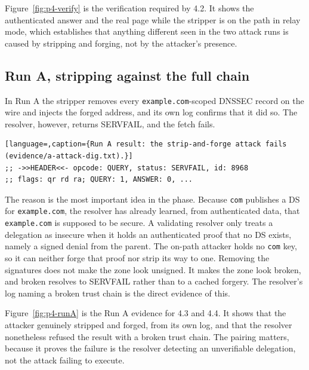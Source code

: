 \documentclass[11pt]{article}
\begin{document}
Figure~\ref{fig:p4-verify} is the verification required by 4.2.
It shows the authenticated answer and the real page while the stripper is on
the path in relay mode, which establishes that anything different seen in the two
attack runs is caused by stripping and forging, not by the attacker's presence.

\subsection{Run A, stripping against the full chain}

In Run A the stripper removes every \texttt{example.com}-scoped DNSSEC record on
the wire and injects the forged address, and its own log confirms that it did so.
The resolver, however, returns SERVFAIL, and the fetch fails.

\begin{lstlisting}[language=,caption={Run A result: the strip-and-forge attack fails (evidence/a-attack-dig.txt).}]
;; ->>HEADER<<- opcode: QUERY, status: SERVFAIL, id: 8968
;; flags: qr rd ra; QUERY: 1, ANSWER: 0, ...
\end{lstlisting}

The reason is the most important idea in the phase. Because \texttt{com} publishes
a DS for \texttt{example.com}, the resolver has already learned, from authenticated
data, that \texttt{example.com} is supposed to be secure. A validating resolver
only treats a delegation as insecure when it holds an authenticated proof that no
DS exists, namely a signed denial from the parent. The on-path attacker holds no
\texttt{com} key, so it can neither forge that proof nor strip its way to one.
Removing the signatures does not make the zone look unsigned. It makes the zone
look broken, and broken resolves to SERVFAIL rather than to a cached forgery. The
resolver's log naming a broken trust chain is the direct evidence of this.


Figure~\ref{fig:p4-runA} is the Run A evidence for 4.3 and 4.4.
It shows that the attacker genuinely stripped and forged, from its own log,
and that the resolver nonetheless refused the result with a broken trust chain.
The pairing matters, because it proves the failure is the resolver detecting an
unverifiable delegation, not the attack failing to execute.
\end{document}
